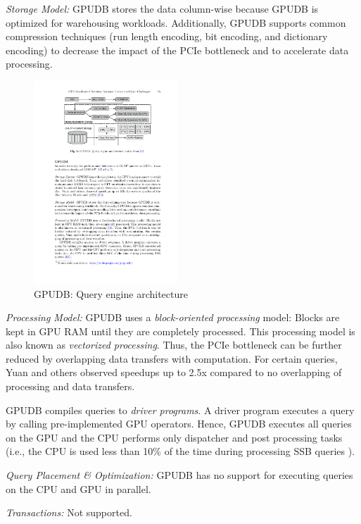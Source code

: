 \documentclass[twocolumn]{article}
\begin{document}
\noindent
\textit{Storage Model:}
 GPUDB stores the data column-wise because GPUDB is optimized for warehousing workloads. Additionally, GPUDB supports common compression techniques (run length encoding, bit encoding, and dictionary encoding) to decrease the impact of the PCIe bottleneck and to accelerate data processing.
\begin{figure}[htb]
        \centering
        \includegraphics[width=0.48\textwidth]{gpudb.pdf}
        \caption{GPUDB: Query engine architecture}
        \label{fig:gpudb}
\end{figure}

\noindent
\textit{Processing Model:}
GPUDB uses a \textit{block-oriented processing} model: Blocks are kept in GPU RAM until they are completely processed. This processing model is also known as \textit{vectorized processing}. Thus, the PCIe bottleneck can be further reduced by overlapping data transfers with computation. For certain queries, Yuan and others observed speedups up to 2.5x compared to no overlapping of processing and data transfers.

GPUDB compiles queries to \textit{driver programs}. A driver program executes a query by calling pre-implemented GPU operators. Hence, GPUDB executes all queries on the GPU and the CPU performs only dispatcher and post processing tasks (i.e., the CPU is used less than 10\% of the time during processing SSB queries \cite{Yuan:2013}).

\noindent
\textit{Query Placement \& Optimization:} GPUDB has no support for executing queries on the CPU and GPU in parallel.

\noindent
\textit{Transactions:} Not supported.
\end{document}
